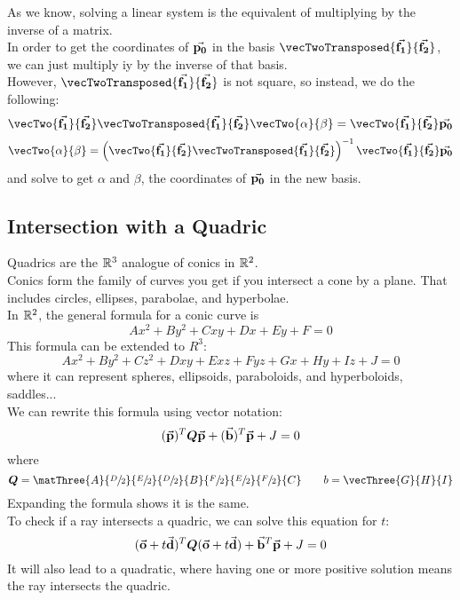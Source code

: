 \documentclass[12pt]{article}
\begin{document}
As we know, solving a linear system
is the equivalent of multiplying by the inverse
of a matrix. \\
In order to get the coordinates of $\vec{\mathbf{p_0}}$
in the basis $\vecTwoTransposed{\bv{f_1}}{\bv{f_2}}$,
we can just multiply iy by the inverse
of that basis. \\
However, $\vecTwoTransposed{\bv{f_1}}{\bv{f_2}}$
is not square, so instead, we do the following:
\[ \vecTwo{\bv{f_1}}{\bv{f_2}}
 \vecTwoTransposed{\bv{f_1}}{\bv{f_2}}
\vecTwo{\alpha}{\beta}
= \vecTwo{\bv{f_1}}{\bv{f_2}}\bv{p_0} \]
\[ \vecTwo{\alpha}{\beta}
= \para{\vecTwo{\bv{f_1}}{\bv{f_2}}
\vecTwoTransposed{\bv{f_1}}{\bv{f_2}}}\inv
\vecTwo{\bv{f_1}}{\bv{f_2}}\bv{p_0} \]
and solve to get $\alpha$ and $\beta$,
the coordinates of $\vec{\mathbf{p_0}}$
in the new basis. \\

\newpage

\subsection*{Intersection with a Quadric}

Quadrics are the $\mathbb{R}^3$ analogue of conics in $\mathbb{R}^2$. \\
Conics form the family of curves you get if you intersect
a cone by a plane.
That includes circles, ellipses, parabolae,
and hyperbolae. \\
In $\mathbb{R}^2$, the general formula for a conic curve is
\[ Ax^2 + By^2 + Cxy + Dx + Ey + F = 0 \]
This formula can be extended to $R^3$:
\[ Ax^2 + By^2 + Cz^2 + Dxy + Exz + Fyz +
Gx + Hy + Iz + J = 0 \]
where it can represent spheres, ellipsoids,
paraboloids, and hyperboloids, saddles... \\

We can rewrite this formula using vector notation:
\[ (\vec{\mathbf{p}})^T \boldsymbol{Q}\vec{\mathbf{p}} 
+ (\vec{\mathbf{b}})^T\vec{\mathbf{p}} + J = 0 \]
where
\[ 
    \boldsymbol{Q} = 
    \matThree{A}{\sfrac{D}{2}}{\sfrac{E}{2}}
    {\sfrac{D}{2}}{B}{\sfrac{F}
    {2}}{\sfrac{E}{2}}{\sfrac{F}{2}}{C}
    \qquad b = \vecThree{G}{H}{I}
\]
Expanding the formula shows it is the same. \\

To check if a ray intersects a quadric,
we can solve this equation for $t$:
\[ (\vec{\mathbf{o}} + t\vec{\mathbf{d}})^T \boldsymbol{Q} (\vec{\mathbf{o}} + t\vec{\mathbf{d}})
    + \vec{\mathbf{b}}^T\vec{\mathbf{p}} + J = 0 \]
It will also lead to a quadratic, 
where having one or more positive solution
means the ray intersects the quadric. \\
\end{document}

